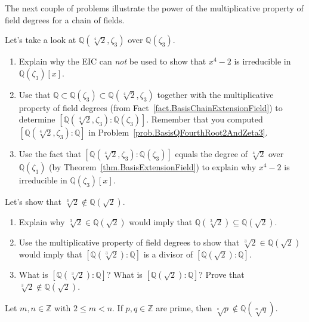 The next couple of problems illustrate the power of the multiplicative property of field degrees for a chain of fields. 

\begin{problem}
Let's take a look at $\mathbb{Q}(\sqrt[4]{2},\zeta_3)$ over $\mathbb{Q}(\zeta_3)$.
\begin{enumerate}
\item Explain why the EIC can \emph{not} be used to show that $x^4-2$ is irreducible in $\mathbb{Q}(\zeta_3)[x]$.
\item Use  that $\mathbb{Q}\subset \mathbb{Q}(\zeta_3) \subset \mathbb{Q}(\sqrt[4]{2},\zeta_3)$  together with the multiplicative property of field degrees (from Fact~\ref{fact.BasisChainExtensionField}) to determine  $[\mathbb{Q}(\sqrt[4]{2},\zeta_3):\mathbb{Q}(\zeta_3)]$. Remember that you computed $[\mathbb{Q}(\sqrt[4]{2},\zeta_3):\mathbb{Q}]$ in Problem~\ref{prob.BasisQFourthRoot2AndZeta3}.
\item Use the fact that $[\mathbb{Q}(\sqrt[4]{2},\zeta_3):\mathbb{Q}(\zeta_3)]$ equals the degree of $\sqrt[4]{2}$ over $\mathbb{Q}(\zeta_3)$ (by Theorem~\ref{thm.BasisExtensionField}) to explain why $x^4-2$ is irreducible in $\mathbb{Q}(\zeta_3)[x]$.
\end{enumerate}
\end{problem}

\begin{problem}
Let's show that $\sqrt[3]{2}\notin \mathbb{Q}(\sqrt{2})$.
\begin{enumerate}
\item Explain why $\sqrt[3]{2}\in \mathbb{Q}(\sqrt{2})$ would imply that $\mathbb{Q}(\sqrt[3]{2})\subseteq\mathbb{Q}(\sqrt{2})$.
\item Use the multiplicative property of field degrees to show that $\sqrt[3]{2}\in \mathbb{Q}(\sqrt{2})$ would imply that $[\mathbb{Q}(\sqrt[3]{2}):\mathbb{Q}]$ is a divisor of $[\mathbb{Q}(\sqrt{2}):\mathbb{Q}]$.
\item What is $[\mathbb{Q}(\sqrt[3]{2}):\mathbb{Q}]$? What is $[\mathbb{Q}(\sqrt{2}):\mathbb{Q}]$? Prove that $\sqrt[3]{2}\notin \mathbb{Q}(\sqrt{2})$.
\end{enumerate}
\end{problem}

\begin{theorem}
Let $m,n\in \mathbb{Z}$ with $2\le m<n$. If $p,q\in \mathbb{Z}$ are prime, then $\sqrt[\overset{n}{}]{p} \notin \mathbb{Q}(\sqrt[\overset{m}{}]{q})$.
\end{theorem}

